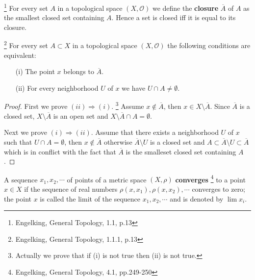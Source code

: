 \begin{definition}
\footnote{Engelking, General Topology, 1.1, p.13}
For every set $A$ in a topological space $(X,\mathcal{O})$ we define the 
\textbf{closure} 
$\overline{A}$ of $A$ as the smallest closed set containing $A$. 
Hence a set is closed iff it is equal to its closure.
\end{definition}

\begin{proposition} \label{P:clos}
\footnote{Engelking, General Topology, 1.1.1, p.13}
For every set $A\subset X$ in a topological space $(X,\mathcal{O})$ the
following conditions are equivalent:
\begin{enumerate}
  \item[(i)] The point $x$ belongs to $\overline{A}$.
  \item[(ii)] For every neighborhood $U$ of $x$ we have $U\cap A\neq\emptyset$.
\end{enumerate}
\end{proposition}
\begin{proof}
First we prove $(ii)\Rightarrow (i)$.
\footnote{Actually we prove that if (i) is not true then (ii) is not true.}
Assume $x\notin\overline{A}$, then $x\in X\setminus \overline{A}$. Since $\overline{A}$ is a 
closed set, $X\setminus \overline{A}$ is an open set and 
$X\setminus \overline{A} \cap A=\emptyset$.

Next we prove $(i)\Rightarrow (ii)$. Assume that there exists a neighborhood $U$
of $x$ such that $U\cap A=\emptyset$, then $x\notin\overline{A}$ otherwise
$\overline{A}\setminus U$ is a closed set and 
$A\subset \overline{A}\setminus U \subset\overline{A}$ which is in conflict with the fact
that $\overline{A}$ is the smalleset closed set containing $A$.
\end{proof}


\begin{definition}
A sequence $x_1,x_2,\cdots$ of points of a metric space $(X,\rho)$
\textbf{converges}
\footnote{Engelking, General Topology, 4.1, pp.249-250}
to a point $x\in X$ if the sequence of real numbers
$\rho(x,x_1),\rho(x,x_2),\cdots$ converges to zero; the point $x$ is called the
limit of the sequence $x_1,x_2,\cdots$ and is denoted by $\lim{x_i}$.
\end{definition}

